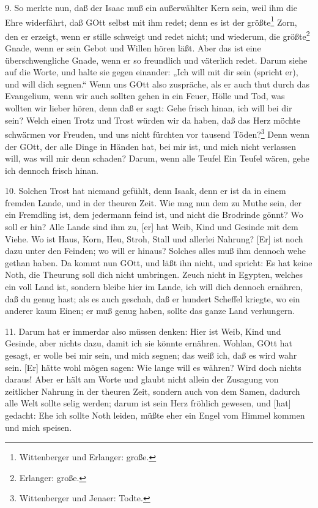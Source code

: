9. So merkte nun, daß der Isaac muß ein außerwählter Kern sein, weil ihm die Ehre widerfährt, daß GOtt selbst mit ihm redet; denn es ist der größte\footnote{Wittenberger und Erlanger: große.} Zorn, den er erzeigt, wenn er stille schweigt und redet nicht; und wiederum, die größte\footnote{Erlanger: große.} Gnade, wenn er sein Gebot und Willen hören läßt. Aber das ist eine überschwengliche Gnade, wenn er so freundlich und väterlich redet. Darum siehe auf die Worte, und halte sie gegen einander: „Ich will mit dir sein (spricht er), und will dich segnen.“ Wenn uns GOtt also zuspräche, als er auch thut durch das Evangelium, wenn wir auch sollten gehen in ein Feuer, Hölle und Tod, was wollten wir lieber hören, denn daß er sagt: Gehe frisch hinan,
ich will bei dir sein? Welch einen Trotz und Trost würden wir da haben, daß das Herz möchte schwärmen vor Freuden, und uns nicht fürchten vor tausend Töden?\footnote{Wittenberger und Jenaer: Todte.} Denn wenn der GOtt, der alle Dinge in Händen hat, bei mir ist, und mich nicht verlassen will, was will mir denn schaden? Darum, wenn alle Teufel Ein Teufel wären, gehe ich dennoch frisch hinan.

10. Solchen Trost hat niemand gefühlt, denn Isaak, denn er ist da in einem fremden Lande, und in der theuren Zeit. Wie mag nun dem zu Muthe sein, der ein Fremdling ist, dem jedermann feind ist, und nicht die Brodrinde gönnt? Wo soll er hin? Alle Lande sind ihm zu, [er] hat Weib, Kind und Gesinde mit dem Viehe. Wo ist Haus, Korn, Heu, Stroh, Stall und allerlei Nahrung? [Er] ist noch dazu unter den Feinden; wo will er hinaus? Solches alles muß ihm dennoch wehe gethan haben. Da kommt nun GOtt, und läßt ihn nicht, und spricht: Es hat keine Noth, die Theurung soll dich nicht umbringen. Zeuch nicht in Egypten, welches ein voll Land ist, sondern bleibe hier im Lande, ich will dich dennoch ernähren, daß du genug hast; als es auch geschah, daß er hundert Scheffel kriegte, wo ein anderer kaum Einen; er muß genug haben, sollte das ganze Land verhungern.

11. Darum hat er immerdar also müssen denken: Hier ist Weib, Kind und Gesinde, aber nichts dazu, damit ich sie könnte ernähren. Wohlan, GOtt hat gesagt, er wolle bei mir sein, und mich segnen; das weiß ich, daß es wird wahr sein. [Er] hätte wohl mögen sagen: Wie lange will es währen? Wird doch nichts daraus! Aber er hält am Worte und glaubt nicht allein der Zusagung von zeitlicher Nahrung in der theuren Zeit, sondern auch von dem Samen, dadurch alle Welt sollte selig werden; darum ist sein Herz fröhlich gewesen, und [hat] gedacht: Ehe ich sollte Noth leiden, müßte eher ein Engel vom Himmel kommen und mich speisen.

